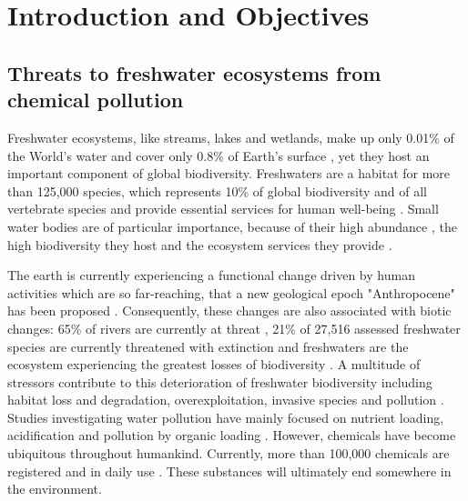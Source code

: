 
\chapter{Introduction and Objectives}
\label{sec:introduction} 

\section{Threats to freshwater ecosystems from chemical pollution}

Freshwater ecosystems, like streams, lakes and wetlands, make up only 0.01\% of the World's water and cover only 0.8\% of Earth's surface \citep{dudgeon_freshwater_2006}, yet they host an important component of global biodiversity. 
Freshwaters are a habitat for more than 125,000 species, which represents 10\% of global biodiversity and  of all vertebrate species \citep{balian_freshwater_2007,  strayer_freshwater_2010} and provide essential services for human well-being \citep{aylward_freshwater_2005}. 
Small water bodies are of particular importance, because of their high abundance \citep{downing_global_2012}, the high biodiversity they host \citep{davies_comparative_2008} and the ecosystem services they provide \citep{biggs_importance_2016}. 

The earth is currently experiencing a functional change driven by human activities which are so far-reaching, that a new geological epoch "Anthropocene" has been proposed \citep{steffen_2011, waters_anthropocene_2016}. 
Consequently, these changes are also associated with biotic changes: 65\% of rivers are currently at threat \citep{vorosmarty_global_2010}, 21\% of 27,516 assessed freshwater species are currently threatened with extinction \citep{iucn_iucn_2016} and freshwaters are the ecosystem experiencing the greatest losses of biodiversity \citep{wwf_living_2016}. 
A multitude of stressors contribute to this deterioration of freshwater biodiversity including habitat loss and degradation, overexploitation, invasive species and pollution \citep{dudgeon_freshwater_2006, vorosmarty_global_2010, wwf_living_2016}. 
Studies investigating water pollution have mainly focused on nutrient loading, acidification and pollution by organic loading \citep{schafer_contribution_2016}. 
However, chemicals have become ubiquitous throughout humankind. 
Currently, more than 100,000 chemicals are registered and in daily use \citep{schwarzman_new_2009, schwarzenbach_global_2010}. 
These substances will ultimately end somewhere in the environment.

